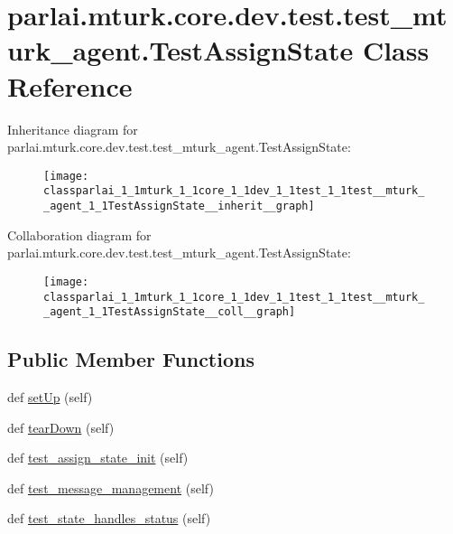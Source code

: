 \hypertarget{classparlai_1_1mturk_1_1core_1_1dev_1_1test_1_1test__mturk__agent_1_1TestAssignState}{}\section{parlai.\+mturk.\+core.\+dev.\+test.\+test\+\_\+mturk\+\_\+agent.\+Test\+Assign\+State Class Reference}
\label{classparlai_1_1mturk_1_1core_1_1dev_1_1test_1_1test__mturk__agent_1_1TestAssignState}


Inheritance diagram for parlai.\+mturk.\+core.\+dev.\+test.\+test\+\_\+mturk\+\_\+agent.\+Test\+Assign\+State\+:
\nopagebreak
\begin{figure}[H]
\begin{center}
\leavevmode
\texttt{[image: classparlai\_1\_1mturk\_1\_1core\_1\_1dev\_1\_1test\_1\_1test\_\_mturk\_\_agent\_1\_1TestAssignState\_\_inherit\_\_graph]}
\end{center}
\end{figure}


Collaboration diagram for parlai.\+mturk.\+core.\+dev.\+test.\+test\+\_\+mturk\+\_\+agent.\+Test\+Assign\+State\+:
\nopagebreak
\begin{figure}[H]
\begin{center}
\leavevmode
\texttt{[image: classparlai\_1\_1mturk\_1\_1core\_1\_1dev\_1\_1test\_1\_1test\_\_mturk\_\_agent\_1\_1TestAssignState\_\_coll\_\_graph]}
\end{center}
\end{figure}
\subsection*{Public Member Functions}
\begin{DoxyCompactItemize}
\item 
def \hyperlink{classparlai_1_1mturk_1_1core_1_1dev_1_1test_1_1test__mturk__agent_1_1TestAssignState_af7b4822d80d66c964b745803fde3f041}{set\+Up} (self)
\item 
def \hyperlink{classparlai_1_1mturk_1_1core_1_1dev_1_1test_1_1test__mturk__agent_1_1TestAssignState_af963ff49ad493a18530891227066e549}{tear\+Down} (self)
\item 
def \hyperlink{classparlai_1_1mturk_1_1core_1_1dev_1_1test_1_1test__mturk__agent_1_1TestAssignState_a36c0f42012772cce6b12875ae3f906f6}{test\+\_\+assign\+\_\+state\+\_\+init} (self)
\item 
def \hyperlink{classparlai_1_1mturk_1_1core_1_1dev_1_1test_1_1test__mturk__agent_1_1TestAssignState_a5b533dedabe075d01387f1c3a7d9496e}{test\+\_\+message\+\_\+management} (self)
\item 
def \hyperlink{classparlai_1_1mturk_1_1core_1_1dev_1_1test_1_1test__mturk__agent_1_1TestAssignState_ab2f45c29a3bbe4b97ee51030e195ea30}{test\+\_\+state\+\_\+handles\+\_\+status} (self)
\end{DoxyCompactItemize}
